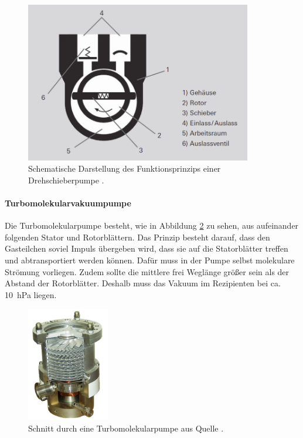 \begin{figure}
  \centering
  \includegraphics[height = 7cm]{pics/dp.png}
  \caption{Schematische Darstellung des Funktionsprinzips einer Drehschieberpumpe \cite{pfeiffer:dp}.}
  \label{fig:dp}
\end{figure}
\FloatBarrier

\paragraph{Turbomolekularvakuumpumpe}
Die Turbomolekularpumpe besteht, wie in Abbildung \ref{fig:stm} zu sehen, aus aufeinander folgenden 
Stator und Rotorblättern. Das Prinzip besteht darauf, dass den Gasteilchen soviel Impuls 
übergeben wird, dass sie auf die Statorblätter treffen und abtransportiert werden können. Dafür 
muss in der Pumpe selbst molekulare Strömung vorliegen. Zudem sollte die 
mittlere frei Weglänge größer sein als der Abstand der Rotorblätter. Deshalb muss das Vakuum im 
Rezipienten bei ca. \SI{10}{\hecto\pascal} liegen.

\begin{figure}
  \centering
  \includegraphics[height = 5cm]{pics/tm.jpg}
  \caption{Schnitt durch eine Turbomolekularpumpe aus Quelle \cite{wiki:tm}.}
  \label{fig:stm}
\end{figure}
\FloatBarrier

